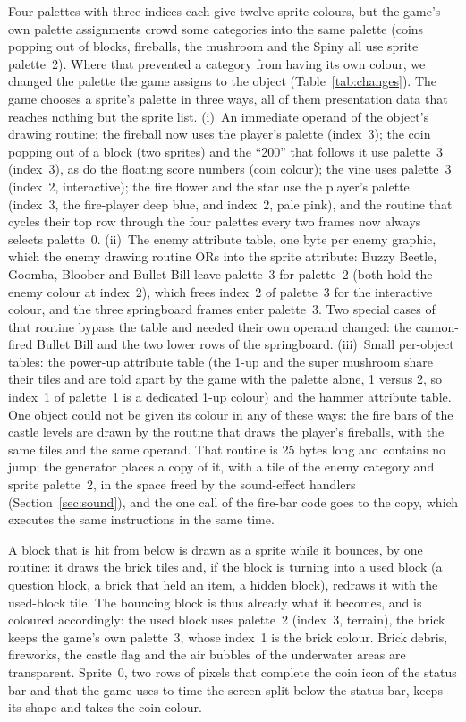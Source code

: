 \documentclass{article}
\begin{document}
Four palettes with three indices each give twelve sprite colours, but the game's own palette
assignments crowd some categories into the same palette (coins popping out of blocks, fireballs,
the mushroom and the Spiny all use sprite palette~2). Where that prevented a category from having
its own colour, we changed the palette the game assigns to the object (Table~\ref{tab:changes}).
The game chooses a sprite's palette in three ways, all of them presentation data that reaches
nothing but the sprite list. (i)~An immediate operand of the object's drawing routine: the
fireball now uses the player's palette (index~3); the coin popping out of a block (two sprites)
and the ``200'' that follows it use palette~3 (index~3), as do the floating score numbers (coin
colour); the vine uses palette~3 (index~2, interactive); the fire flower and the star use the
player's palette (index~3, the fire-player deep blue, and index~2, pale pink), and the routine that
cycles their top row through the four palettes every two frames now always selects palette~0.
(ii)~The enemy attribute table, one byte per enemy graphic, which the enemy drawing routine ORs
into the sprite attribute: Buzzy Beetle, Goomba, Bloober and Bullet Bill leave palette~3 for
palette~2 (both hold the enemy colour at index~2), which frees index~2 of palette~3 for the
interactive colour, and the three springboard frames enter palette~3. Two special cases of that
routine bypass the table and needed their own operand changed: the cannon-fired Bullet Bill and the
two lower rows of the springboard. (iii)~Small per-object tables: the power-up attribute table
(the 1-up and the super mushroom share their tiles and are told apart by the game with the palette
alone, 1 versus 2, so index~1 of palette~1 is a dedicated 1-up colour) and the hammer attribute
table. One object could not be given its colour in any of these ways: the fire bars of the castle
levels are drawn by the routine that draws the player's fireballs, with the same tiles and the
same operand. That routine is 25 bytes long and contains no jump; the generator places a copy of
it, with a tile of the enemy category and sprite palette~2, in the space freed by the sound-effect
handlers (Section~\ref{sec:sound}), and the one call of the fire-bar code goes to the copy, which
executes the same instructions in the same time.

A block that is hit from below is drawn as a sprite while it bounces, by one routine: it draws the
brick tiles and, if the block is turning into a used block (a question block, a brick that held an
item, a hidden block), redraws it with the used-block tile. The bouncing block is thus already
what it becomes, and is coloured accordingly: the used block uses palette~2 (index~3, terrain),
the brick keeps the game's own palette~3, whose index~1 is the brick colour. Brick debris,
fireworks, the castle flag and the air bubbles of the underwater areas are transparent. Sprite~0,
two rows of pixels that complete the coin icon of the status bar and that the game uses to time the
screen split below the status bar, keeps its shape and takes the coin colour.
\end{document}
